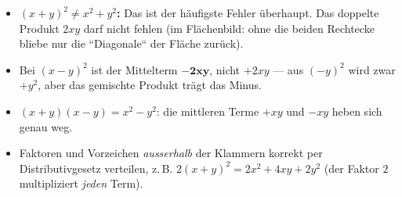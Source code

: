 \begin{achtung}
\begin{itemize}
  \item \textbf{$(x+y)^2\neq x^2+y^2$:} Das ist der häufigste Fehler
        überhaupt. Das doppelte Produkt $2xy$ darf nicht fehlen (im
        Flächenbild: ohne die beiden Rechtecke bliebe nur die
        ``Diagonale`` der Fläche zurück).
  \item Bei $(x-y)^2$ ist der Mittelterm $\boldsymbol{-2xy}$, nicht
        $+2xy$ --- aus $(-y)^2$ wird zwar $+y^2$, aber das gemischte
        Produkt trägt das Minus.
  \item $(x+y)(x-y)=x^2-y^2$: die mittleren Terme $+xy$ und $-xy$
        heben sich genau weg.
  \item Faktoren und Vorzeichen \emph{ausserhalb} der Klammern korrekt
        per Distributivgesetz verteilen, z.\,B.
        $2(x+y)^2=2x^2+4xy+2y^2$ (der Faktor $2$ multipliziert \emph{jeden}
        Term).
\end{itemize}
\end{achtung}

